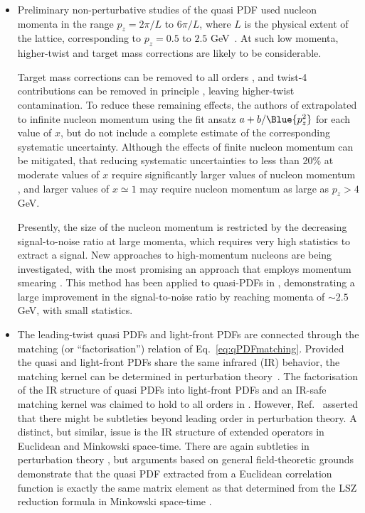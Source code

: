 \begin{itemize}
 \item Preliminary non-perturbative studies of the quasi PDF used nucleon momenta in the range $p_z = 2\pi/L$ to $6\pi/L$, where $L$ is the physical extent of the lattice, corresponding to $p_z = 0.5$ to $2.5$ GeV~\cite{Lin:2014zya,Alexandrou:2015rja,Chen:2016utp,Alexandrou:2016jqi}. At such low momenta, higher-twist and target mass corrections are likely to be considerable.

Target mass corrections can be removed to all orders \cite{Chen:2016utp}, and twist-4 contributions can be removed in principle \cite{%
Chen:2016utp}, leaving higher-twist contamination. To reduce these remaining effects, the authors of \cite{Lin:2014zya,Chen:2016utp} extrapolated to infinite nucleon momentum using the fit ansatz $a + b/\Blue{p_z^2}$ for each value of $x$, but do not include a complete estimate of the corresponding systematic uncertainty. Although the effects of finite nucleon momentum can be mitigated,  that reducing systematic uncertainties to less than 20\% at moderate values of $x$ require significantly larger values of nucleon momentum \cite{Gamberg:2014zwa}, and larger values of $x\simeq 1$ may require nucleon momentum as large as $p_z > 4$ GeV.

Presently, the size of the nucleon momentum is restricted by the decreasing signal-to-noise ratio at large momenta, which requires very high statistics to extract a signal. New approaches to high-momentum nucleons are being investigated, with the most promising an approach that employs momentum smearing \cite{Bali:2016lva}. This method has been applied to quasi-PDFs in \cite{Alexandrou:2016jqi}, demonstrating a large improvement in the signal-to-noise ratio by reaching momenta of $\sim 2.5$ GeV, with small statistics.

\item The leading-twist quasi PDFs and light-front PDFs are connected through the matching (or ``factorisation'') relation of Eq.~\eqref{eq:qPDFmatching}. Provided the quasi and light-front PDFs share the same infrared (IR) behavior, the matching kernel can be determined in perturbation theory~\cite{Xiong:2013bka}. The factorisation of the IR structure of quasi PDFs into light-front PDFs and an IR-safe matching kernel was claimed to hold to all orders in \cite{Ma:2014jla, Ma:2014jga,Ma:2017pxb}. However, Ref.~\cite{Li:2016amo} asserted that there might be subtleties beyond leading order in perturbation theory. A distinct, but similar, issue is the IR structure of extended operators in Euclidean and Minkowski space-time. There are again subtleties in perturbation theory \cite{Carlson:2017gpk}, but arguments based on general field-theoretic grounds demonstrate that the quasi PDF extracted from a Euclidean correlation function is exactly the same matrix element as that determined from the LSZ reduction formula in Minkowski space-time \cite{Briceno:2017cpo}.


\end{itemize}
